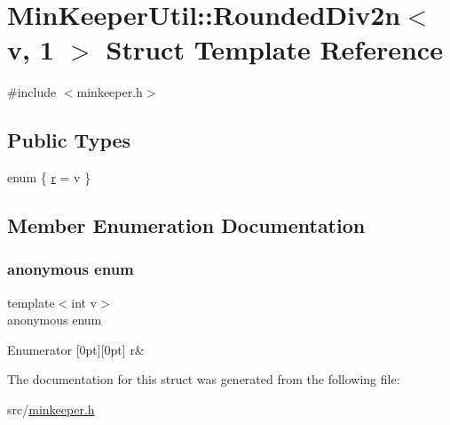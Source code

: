\hypertarget{structMinKeeperUtil_1_1RoundedDiv2n_3_01v_00_011_01_4}{}\section{Min\+Keeper\+Util\+:\+:Rounded\+Div2n$<$ v, 1 $>$ Struct Template Reference}
\label{structMinKeeperUtil_1_1RoundedDiv2n_3_01v_00_011_01_4}


{\ttfamily \#include $<$minkeeper.\+h$>$}

\subsection*{Public Types}
\begin{DoxyCompactItemize}
\item 
enum \{ \hyperlink{structMinKeeperUtil_1_1RoundedDiv2n_3_01v_00_011_01_4_a02aa0c1218a416a310b84ebe8935b225ad74fef0a7d97773c25ca254977e29daf}{r} = v
 \}
\end{DoxyCompactItemize}


\subsection{Member Enumeration Documentation}
\mbox{\label{structMinKeeperUtil_1_1RoundedDiv2n_3_01v_00_011_01_4_a02aa0c1218a416a310b84ebe8935b225}} 
\subsubsection{\texorpdfstring{anonymous enum}{anonymous enum}}
{\footnotesize\ttfamily template$<$int v$>$ \\
anonymous enum}

\begin{DoxyEnumFields}{Enumerator}
[0pt][0pt]{}\mbox{\label{structMinKeeperUtil_1_1RoundedDiv2n_3_01v_00_011_01_4_a02aa0c1218a416a310b84ebe8935b225ad74fef0a7d97773c25ca254977e29daf}} 
r&\\
\hline

\end{DoxyEnumFields}


The documentation for this struct was generated from the following file\+:\begin{DoxyCompactItemize}
\item 
src/\hyperlink{minkeeper_8h}{minkeeper.\+h}\end{DoxyCompactItemize}
